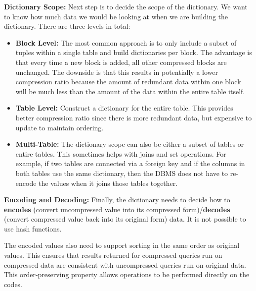 \documentclass[11pt]{article}
\begin{document}
\textbf{Dictionary Scope:} Next step is to decide the scope of the dictionary. We want to know how much data we would be looking at when we are building the dictionary. There are three levels in total:
\begin{itemize}
    \item \textbf{Block Level:}
    The most common approach is to only include a subset of tuples within
    a single table and build dictionaries per block. The advantage is that every time a new block
    is added, all other compressed blocks are unchanged. The downside is that this results in
    potentially a lower compression ratio because the amount of redundant data within one block will
    be much less than the amount of the data within the entire table itself.

    \item \textbf{Table Level:}
    Construct a dictionary for the entire table. This provides better compression ratio since there
    is more redundant data, but expensive to update to maintain ordering.

    \item \textbf{Multi-Table:}
    The dictionary scope can also be either a subset of tables or entire tables. This sometimes
    helps with joins and set operations. For example, if two tables are connected via a foreign key
    and if the columns in both tables use the same dictionary, then the DBMS does not have to
    re-encode the values when it joins those tables together.
\end{itemize}

\textbf{Encoding and Decoding:} Finally, the dictionary needs to decide how to \textbf{encodes} (convert uncompressed value into its compressed form)/\textbf{decodes} (convert compressed value back into its original form) data. It is not possible to use hash functions.

The encoded values also need to support sorting in the same order as original values. This ensures that results returned for compressed queries run on compressed data are consistent with uncompressed queries run on original data. This order-preserving property allows operations to be performed directly on the codes.
\end{document}
